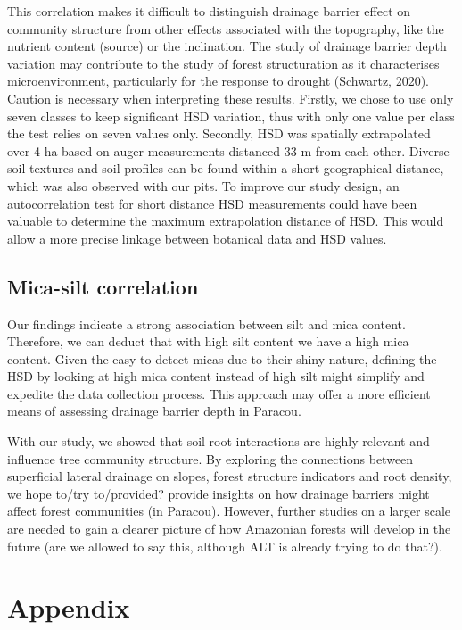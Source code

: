 \documentclass[fleqn,12pt]{latex/stylish_article} %
\begin{document}
This correlation makes it difficult to distinguish drainage barrier effect on community structure from other effects associated with the topography, like the nutrient content (source) or the inclination. The study of drainage barrier depth variation may contribute to the study of forest structuration as it characterises microenvironment, particularly for the response to drought (Schwartz, 2020).
Caution is necessary when interpreting these results. Firstly, we chose to use only seven classes to keep significant HSD variation, thus with only one value per class the test relies on seven values only. Secondly, HSD was spatially extrapolated over 4 ha based on auger measurements distanced 33 m from each other. Diverse soil textures and soil profiles can be found within a short geographical distance, which was also observed with our pits. To improve our study design, an autocorrelation test for short distance HSD measurements could have been valuable to determine the maximum extrapolation distance of HSD. This would allow a more precise linkage between botanical data and HSD values.

\hypertarget{mica-silt-correlation}{%
\subsection{Mica-silt correlation}\label{mica-silt-correlation}}

Our findings indicate a strong association between silt and mica content. Therefore, we can deduct that with high silt content we have a high mica content. Given the easy to detect micas due to their shiny nature, defining the HSD by looking at high mica content instead of high silt might simplify and expedite the data collection process. This approach may offer a more efficient means of assessing drainage barrier depth in Paracou.

With our study, we showed that soil-root interactions are highly relevant and influence tree community structure. By exploring the connections between superficial lateral drainage on slopes, forest structure indicators and root density, we hope to/try to/provided? provide insights on how drainage barriers might affect forest communities (in Paracou). However, further studies on a larger scale are needed to gain a clearer picture of how Amazonian forests will develop in the future (are we allowed to say this, although ALT is already trying to do that?).

\hypertarget{appendix}{%
\section{Appendix}\label{appendix}}
\end{document}
